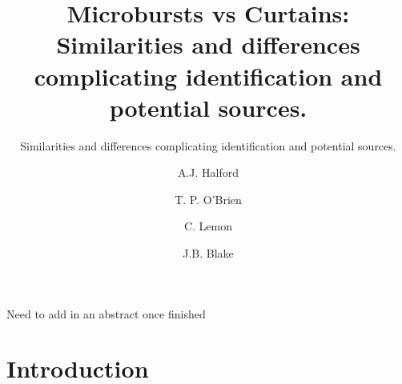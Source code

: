 \documentclass[referee,a4paper,12pt,traditabstract]{swsc}
\begin{document}
\begin{linenumbers}  

   \title{Microbursts vs Curtains: Similarities and differences complicating identification and potential sources. }

   \subtitle{Similarities and differences complicating identification and potential sources.}
   


   \author{A.J. Halford
          \and
          T. P. O'Brien 
          	\and 
	C. Lemon  
	\and 
	J.B. Blake 
	}
          

           


 
  \abstract
   {Need to add in an abstract once finished}        %
   


   \maketitle

\section{Introduction}


\end{linenumbers}
\end{document}
